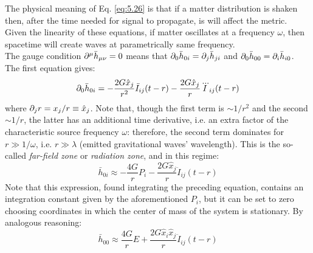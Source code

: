 The physical meaning of Eq. \ref{eq:5.26} is that if a matter distribution is shaken then, after the time needed for signal to propagate, is will affect the metric. Given the linearity of these equations, if matter oscillates at a frequency $ \omega $, then spacetime will create waves at parametrically same frequency.\\
The gauge condition $ \partial^\mu \bar{h}_{\mu \nu} = 0 $ means that $ \partial_0 \bar{h}_{0i} = \partial_j \bar{h}_{ji} $ and $ \partial_0 \bar{h}_{00} = \partial_i \bar{h}_{i0} $. The first equation gives:
\begin{equation*}
  \partial_0 \bar{h}_{0i} = - \frac{2G \hat{x}_j}{r^2} \ddot{I}_{ij}(t - r) - \frac{2G \hat{x}_j}{r} \dddot{I}_{ij}(t - r)
\end{equation*}
where $ \partial_j r = x_j / r \equiv \hat{x}_j $. Note that, though the first term is $ \sim 1/r^2 $ and the second $ \sim 1/r $, the latter has an additional time derivative, i.e. an extra factor of the characteristic source frequency $ \omega $: therefore, the second term dominates for $ r \gg 1/\omega $, i.e. $ r \gg \lambda $ (emitted gravitational waves' wavelength). This is the so-called \textit{far-field zone} or \textit{radiation zone}, and in this regime:
\begin{equation}
  \bar{h}_{0i} \approx - \frac{4G}{r} P_i - \frac{2G \hat{x}_j}{r} \ddot{I}_{ij} (t - r)
  \label{eq:5.27}
\end{equation}
Note that this expression, found integrating the preceding equation, contains an integration constant given by the aforementioned $ P_i $, but it can be set to zero choosing coordinates in which the center of mass of the system is stationary. By analogous reasoning:
\begin{equation}
  \bar{h}_{00} \approx \frac{4G}{r} E + \frac{2G \hat{x}_i \hat{x}_j}{r} \ddot{I}_{ij} (t - r)
  \label{eq:5.28}
\end{equation}










